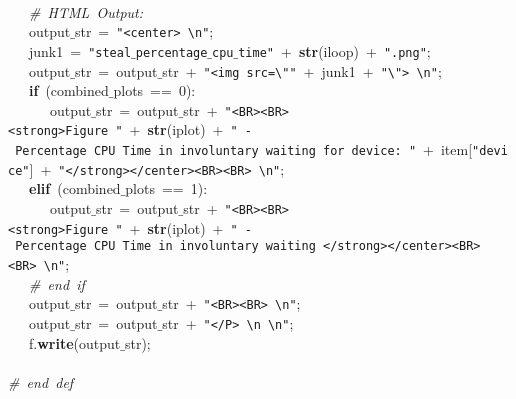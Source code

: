 \mbox{}\ \ \  \\
\mbox{}\ \ \ \textit{\#\ HTML\ Output:} \\
\mbox{}\ \ \ output$\_$str\ =\ \texttt{"{}\textless{}center\textgreater{}\ \textbackslash{}n"{}}; \\
\mbox{}\ \ \ junk1\ =\ \texttt{"{}steal$\_$percentage$\_$cpu$\_$time"{}}\ +\ \textbf{str}(iloop)\ +\ \texttt{"{}.png"{}}; \\
\mbox{}\ \ \ output$\_$str\ =\ output$\_$str\ +\ \texttt{"{}\textless{}img\ src=\textbackslash{}"{}"{}}\ +\ junk1\ +\ \texttt{"{}\textbackslash{}"{}\textgreater{}\ \textbackslash{}n"{}}; \\
\mbox{}\ \ \ \textbf{if}\ (combined$\_$plots\ ==\ 0): \\
\mbox{}\ \ \ \ \ \ output$\_$str\ =\ output$\_$str\ +\ \texttt{"{}\textless{}BR\textgreater{}\textless{}BR\textgreater{}\textless{}strong\textgreater{}Figure\ "{}}\ +\ \textbf{str}(iplot)\ +\ \texttt{"{}\ -\ Percentage\ CPU\ Time\ in\ involuntary\ waiting\ for\ device:\ "{}}\ +\ item[\texttt{"{}device"{}}]\ +\ \texttt{"{}\textless{}/strong\textgreater{}\textless{}/center\textgreater{}\textless{}BR\textgreater{}\textless{}BR\textgreater{}\ \textbackslash{}n"{}}; \\
\mbox{}\ \ \ \textbf{elif}\ (combined$\_$plots\ ==\ 1): \\
\mbox{}\ \ \ \ \ \ output$\_$str\ =\ output$\_$str\ +\ \texttt{"{}\textless{}BR\textgreater{}\textless{}BR\textgreater{}\textless{}strong\textgreater{}Figure\ "{}}\ +\ \textbf{str}(iplot)\ +\ \texttt{"{}\ -\ Percentage\ CPU\ Time\ in\ involuntary\ waiting\ \textless{}/strong\textgreater{}\textless{}/center\textgreater{}\textless{}BR\textgreater{}\textless{}BR\textgreater{}\ \textbackslash{}n"{}}; \\
\mbox{}\ \ \ \textit{\#\ end\ if} \\
\mbox{}\ \ \ output$\_$str\ =\ output$\_$str\ +\ \texttt{"{}\textless{}BR\textgreater{}\textless{}BR\textgreater{}\ \textbackslash{}n"{}}; \\
\mbox{}\ \ \ output$\_$str\ =\ output$\_$str\ +\ \texttt{"{}\textless{}/P\textgreater{}\ \textbackslash{}n\ \textbackslash{}n"{}}; \\
\mbox{}\ \ \ f.\textbf{write}(output$\_$str); \\
\mbox{}\ \ \  \\
\mbox{}\textit{\#\ end\ def} \\
\mbox{} \\
\mbox{} \\
\mbox{} \\

